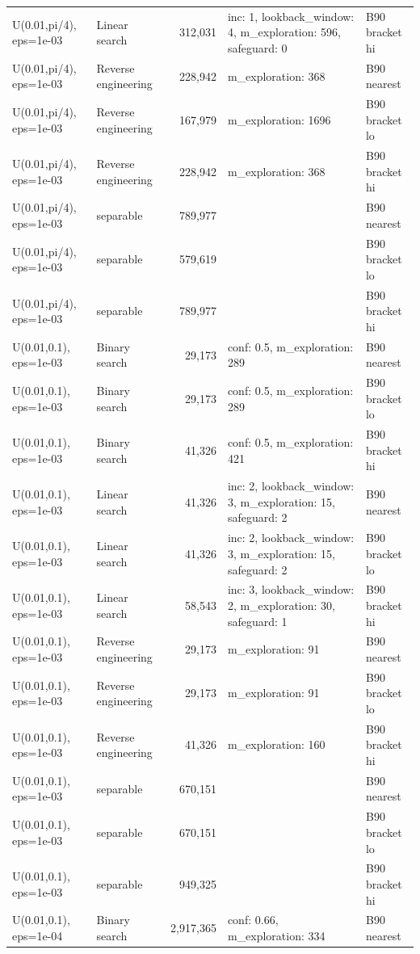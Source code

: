 \begin{tabular}{llrll}
U(0.01,pi/4), eps=1e-03 & Linear search & 312,031 & inc: 1, lookback\_window: 4, m\_exploration: 596, safeguard: 0 & B90 bracket hi \\
U(0.01,pi/4), eps=1e-03 & Reverse engineering & 228,942 & m\_exploration: 368 & B90 nearest \\
U(0.01,pi/4), eps=1e-03 & Reverse engineering & 167,979 & m\_exploration: 1696 & B90 bracket lo \\
U(0.01,pi/4), eps=1e-03 & Reverse engineering & 228,942 & m\_exploration: 368 & B90 bracket hi \\
U(0.01,pi/4), eps=1e-03 & separable & 789,977 &  & B90 nearest \\
U(0.01,pi/4), eps=1e-03 & separable & 579,619 &  & B90 bracket lo \\
U(0.01,pi/4), eps=1e-03 & separable & 789,977 &  & B90 bracket hi \\
U(0.01,0.1), eps=1e-03 & Binary search & 29,173 & conf: 0.5, m\_exploration: 289 & B90 nearest \\
U(0.01,0.1), eps=1e-03 & Binary search & 29,173 & conf: 0.5, m\_exploration: 289 & B90 bracket lo \\
U(0.01,0.1), eps=1e-03 & Binary search & 41,326 & conf: 0.5, m\_exploration: 421 & B90 bracket hi \\
U(0.01,0.1), eps=1e-03 & Linear search & 41,326 & inc: 2, lookback\_window: 3, m\_exploration: 15, safeguard: 2 & B90 nearest \\
U(0.01,0.1), eps=1e-03 & Linear search & 41,326 & inc: 2, lookback\_window: 3, m\_exploration: 15, safeguard: 2 & B90 bracket lo \\
U(0.01,0.1), eps=1e-03 & Linear search & 58,543 & inc: 3, lookback\_window: 2, m\_exploration: 30, safeguard: 1 & B90 bracket hi \\
U(0.01,0.1), eps=1e-03 & Reverse engineering & 29,173 & m\_exploration: 91 & B90 nearest \\
U(0.01,0.1), eps=1e-03 & Reverse engineering & 29,173 & m\_exploration: 91 & B90 bracket lo \\
U(0.01,0.1), eps=1e-03 & Reverse engineering & 41,326 & m\_exploration: 160 & B90 bracket hi \\
U(0.01,0.1), eps=1e-03 & separable & 670,151 &  & B90 nearest \\
U(0.01,0.1), eps=1e-03 & separable & 670,151 &  & B90 bracket lo \\
U(0.01,0.1), eps=1e-03 & separable & 949,325 &  & B90 bracket hi \\
U(0.01,0.1), eps=1e-04 & Binary search & 2,917,365 & conf: 0.66, m\_exploration: 334 & B90 nearest \\

\end{tabular}
